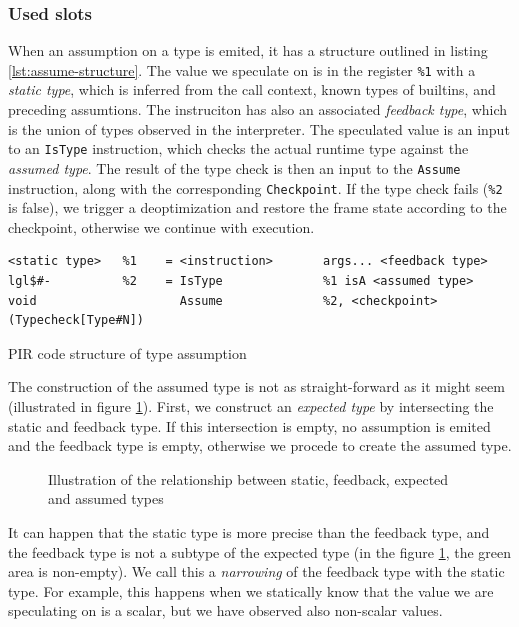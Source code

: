 \subsubsection*{Used slots}

When an assumption on a type is emited, it has a structure outlined in listing \ref{lst:assume-structure}. The value we speculate on is in the register \texttt{\%1} with a \textit{static type}, which is inferred from the call context, known types of builtins, and preceding assumtions. The instruciton has also an associated \textit{feedback type}, which is the union of types observed in the interpreter. The speculated value is an input to an \texttt{IsType} instruction, which checks the actual runtime type against the \textit{assumed type}. The result of the type check is then an input to the \texttt{Assume} instruction, along with the corresponding \texttt{Checkpoint}. If the type check fails (\texttt{\%2} is false), we trigger a deoptimization and restore the frame state according to the checkpoint, otherwise we continue with execution.

\begin{listing}[H]
  \centering
	\begin{verbatim}
<static type>   %1    = <instruction>       args... <feedback type>
lgl$#-          %2    = IsType              %1 isA <assumed type>
void                    Assume              %2, <checkpoint> (Typecheck[Type#N])
  \end{verbatim}
	\caption{PIR code structure of type assumption}\label{lst:assume-structure}
\end{listing}

The construction of the assumed type is not as straight-forward as it might seem (illustrated in figure \ref{fig:types-venn}). First, we construct an \textit{expected type} by intersecting the static and feedback type. If this intersection is empty, no assumption is emited and the feedback type is empty, otherwise we procede to create the assumed type.

\begin{figure}
	\centering
	\caption{Illustration of the relationship between static, feedback, expected and assumed types}\label{fig:types-venn}
\end{figure}

It can happen that the static type is more precise than the feedback type, and the feedback type is not a subtype of the expected type (in the figure \ref{fig:types-venn}, the green area is non-empty). We call this a \textit{narrowing} of the feedback type with the static type. For example, this happens when we statically know that the value we are speculating on is a scalar, but we have observed also non-scalar values.


